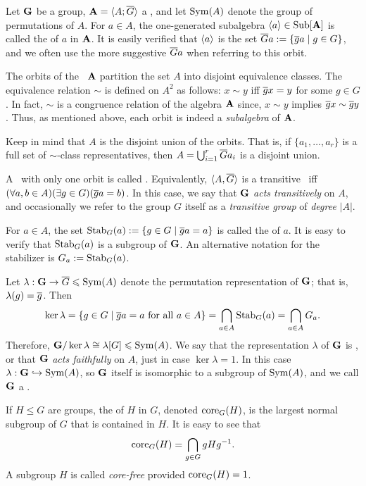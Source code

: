 Let $\mathbf{G}$ be a group, $\mathbf{A}= \langle A; \overline{G}\rangle$ a \Gset, and let $\operatorname{Sym}(A)$ denote the group of
permutations of $A$.
For $a\in A$, the one-generated subalgebra $\langle a\rangle\in \operatorname{Sub}[\mathbf{A}]$ is
called the  of $a$ in $\mathbf{A}$. 
It is easily verified that $\langle a\rangle$ is the set
$ \overline{G} a :=  \{\overline{g} a \mid g\in G\}$, and we often use the more suggestive 
$\overline{G} a$ when referring to this orbit.

The orbits of the \Gset\ $\mathbf{A}$ partition the set $A$ into disjoint
equivalence classes.  The equivalence relation $\sim$ is defined on $A^2$ as follows: 
$x \sim y$ iff $\overline{g} x = y$ for some $g\in G$.
In fact, $\sim$ is a congruence relation of the algebra $\mathbf{A}$ since,
$x \sim y$ implies $\overline{g} x \sim \overline{g} y$.
Thus, as mentioned above, each orbit is indeed a \emph{subalgebra} of $\mathbf{A}$.

Keep in mind that $A$ is the disjoint union of the
orbits.  That is, if $\{a_1, \dots, a_r\}$ is a full
set of $\sim$-class representatives, then $A = \bigcup_{i=1}^r \overline{G} a_i$ is a disjoint union.

A \Gset\ with only one orbit is called 
.  Equivalently, $\langle A, \overline{G}\rangle$ is a transitive \Gset\ iff 
$(\forall a, b \in A)(\exists g\in G)(\overline{g} a = b)$. 
In this case, we say that $\mathbf{G}$ \emph{acts transitively} on $A$,
and occasionally we refer to the group $G$ itself as a \emph{transitive group} of \emph{degree} $|A|$.  

For $a\in A$, the set $\mathrm{Stab}_G(a) := \{g \in G \mid  \overline{g} a  = a\}$ is called the 
 of $a$.  It is easy to verify  that $\mathrm{Stab}_G(a)$ is a
subgroup of $\mathbf{G}$.  An alternative notation for the stabilizer 
is $G_a := \mathrm{Stab}_G(a)$.

Let $\lambda : \mathbf{G} \rightarrow \overline{G} \leqslant \operatorname{Sym}(A)$ denote the permutation representation
of $\mathbf{G}$; that is, $\lambda(g) = \overline{g}$. Then 
\begin{equation}
  \label{eq:111}
\ker \lambda = \{g\in G  \mid  \overline{g} a = a \text{ for all $a\in A$}\} = \bigcap_{a\in A}
\mathrm{Stab}_G(a)
= \bigcap_{a\in A} G_a.
\end{equation}
Therefore, $\mathbf{G}/\ker\lambda \cong \lambda[G]\leqslant \operatorname{Sym}(A)$.
We say that the representation $\lambda$ of $\mathbf{G}$ is , or 
that $\mathbf{G}$ \emph{acts faithfully} on $A$, just in case $\ker \lambda = 1$. In
this case $\lambda : \mathbf{G} \hookrightarrow \operatorname{Sym}(A)$, so $\mathbf{G}$ itself is isomorphic to a subgroup of 
$\operatorname{Sym}(A)$, and we call $\mathbf{G}$ a .

If $H \leq G$ are groups, the  of $H$ in $G$, denoted $\mathrm{core}_G(H)$,
is the largest normal subgroup of $G$ that is contained in $H$.  It is easy to see
that
\[
\mathrm{core}_G(H) = \bigcap_{g\in G}g H g^{-1}.
\]
A subgroup $H$ is called \emph{core-free} provided $\mathrm{core}_G(H)=1$.

